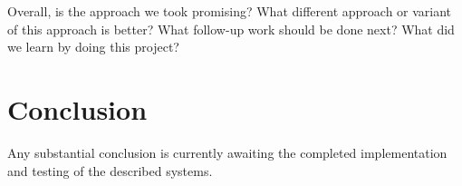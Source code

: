 \documentclass[accepted,single]{gipaper}
\begin{document}
Overall, is the approach we took promising?
What different approach or variant of this approach is better?
What follow-up work should be done next?
What did we learn by doing this project?

\section{Conclusion}
\label{conclusion}

Any substantial conclusion is currently awaiting the completed implementation and testing of the described systems.


\end{document}
